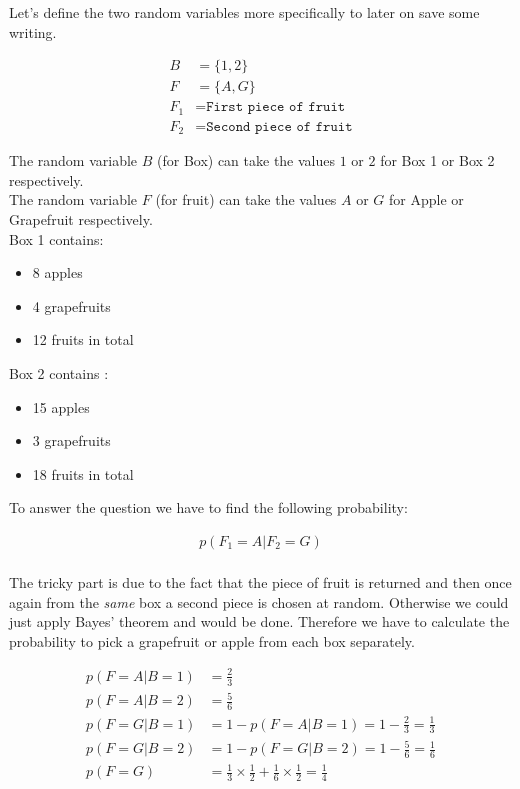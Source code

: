 \documentclass[a4paper]{article}
\begin{document}
Let's define the two random variables more specifically to later on save some writing. 

\begin{align*}
	B &= \{ 1,2\}\\
	F &= \{ A,G \}\\
	F_1 &= \texttt{First piece of fruit}\\
	F_2 &= \texttt{Second piece of fruit}
\end{align*}

The random variable $B$ (for Box) can take the values $1$ or $2$ for Box 1 or Box 2 respectively.\\
The random variable $F$ (for fruit) can take the values $A$ or $G$ for Apple or Grapefruit respectively.\\ 

Box 1 contains:

\begin{itemize}
	\item 8 apples
	\item 4 grapefruits
	\item 12 fruits in total
\end{itemize}

Box 2 contains :

\begin{itemize}
	\item 15 apples
	\item 3 grapefruits
	\item 18 fruits in total
\end{itemize}

To answer the question we have to find the following probability:

\begin{align*}
	p(F_1 = A | F_2 = G)\\	
\end{align*}



The tricky part is due to the fact that the piece of fruit is returned and then once again from the \textit{same} box a second piece is chosen at random. Otherwise we could just apply Bayes' theorem and would be done. Therefore we have to calculate the probability to pick a grapefruit or apple from each box separately.

\begin{align*}
	p(F = A | B = 1) &= \frac{2}{3}\\
	p(F = A | B = 2) &= \frac{5}{6}\\
	p(F = G | B = 1) &= 1 - p(F = A | B = 1) = 1 - \frac{2}{3} = \frac{1}{3}\\
	p(F = G | B = 2) &= 1 - p(F = G | B = 2) = 1 - \frac{5}{6} = \frac{1}{6}\\
	p(F = G) &= \frac{1}{3} \times \frac{1}{2} + \frac{1}{6} \times \frac{1}{2} = \frac{1}{4}
\end{align*}
\end{document}
